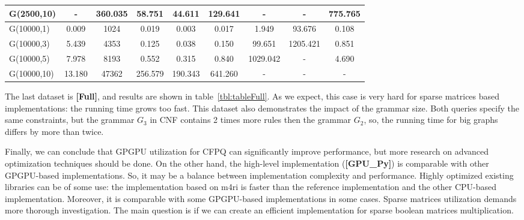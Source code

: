 \begin{table*}
\begin{tabular}{| l | c | c | c | c | c | c | c | c |}
    G(2500,10)             & -       & 360.035           & 58.751  & 44.611         & 129.641 & -                & -        & 775.765 \\
    \hline
    G(10000,1)             & 0.009   & 1024              & 0.019   & 0.003          & 0.017   & 1.949            & 93.676   & 0.108  \\
    G(10000,3)             & 5.439   & 4353              & 0.125   & 0.038          & 0.150   & 99.651           & 1205.421 & 0.851  \\
    G(10000,5)             & 7.978   & 8193              & 0.552   & 0.315          & 0.840   & 1029.042         & -        & 4.690  \\
    G(10000,10)            & 13.180  & 47362             & 256.579 & 190.343        & 641.260 & -                & -        & -      \\

    \hline
  \end{tabular}
\end{table*}

The last dataset is \textbf{[Full]}, and results are shown in table~\ref{tbl:tableFull}.
As we expect, this case is very hard for sparse matrices based implementations: the running time grows too fast.
This dataset also demonstrates the impact of the grammar size.
Both queries specify the same constraints, but the grammar $G_3$ in CNF contains 2 times more rules then the grammar $G_2$, so, the running time for big graphs differs by more than twice.

Finally, we can conclude that GPGPU utilization for CFPQ can significantly improve performance, but more research on advanced optimization techniques should be done.
On the other hand, the high-level implementation (\textbf{[GPU\_Py]}) is comparable with other GPGPU-based implementations.
So, it may be a balance between implementation complexity and performance.
Highly optimized existing libraries can be of some use: the implementation based on m4ri is faster than the reference implementation and the other CPU-based implementation.
Moreover, it is comparable with some GPGPU-based implementations in some cases.
Sparse matrices utilization demands more thorough investigation.
The main question is if we can create an efficient implementation for sparse boolean matrices multiplication.
